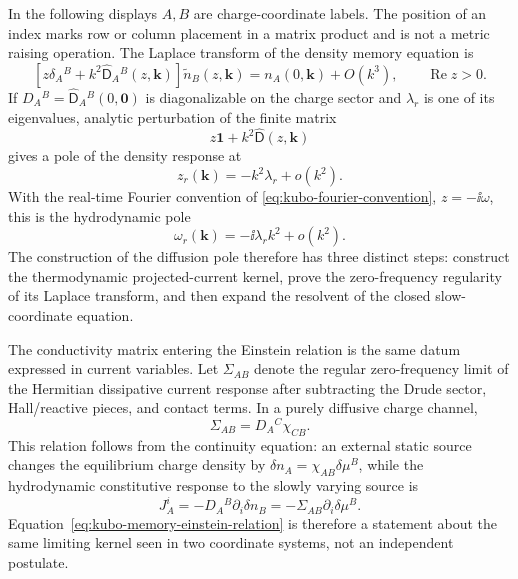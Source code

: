 In the following displays \(A,B\) are charge-coordinate labels.  The position
of an index marks row or column placement in a matrix product and is not a
metric raising operation.  The Laplace transform of the density memory
equation is
\begin{equation}
  \left[
    z\delta_A{}^B
    +
    k^2\widehat{\mathsf D}_{A}{}^{B}(z,\mathbf k)
  \right]
  \widetilde n_B(z,\mathbf k)
  =
  n_A(0,\mathbf k)
  +O(k^3),
  \qquad \operatorname{Re}z>0 .
  \label{eq:kubo-memory-laplace-density-equation}
\end{equation}
If \(D_A{}^B=\widehat{\mathsf D}_{A}{}^{B}(0,\mathbf0)\) is diagonalizable
on the charge sector and \(\lambda_r\) is one of its eigenvalues, analytic
perturbation of the finite matrix
\[
  z\mathbf 1+k^2\widehat{\mathsf D}(z,\mathbf k)
\]
gives a pole of the density response at
\begin{equation}
  z_r(\mathbf k)
  =
  -k^2\lambda_r+o(k^2).
  \label{eq:kubo-memory-diffusive-laplace-pole}
\end{equation}
With the real-time Fourier convention of
\eqref{eq:kubo-fourier-convention}, \(z=-\ii\omega\), this is the
hydrodynamic pole
\begin{equation}
  \omega_r(\mathbf k)
  =
  -\ii\lambda_r k^2+o(k^2).
  \label{eq:kubo-memory-diffusive-frequency-pole}
\end{equation}
The construction of the diffusion pole therefore has three distinct steps:
construct the thermodynamic projected-current kernel, prove the
zero-frequency regularity of its Laplace transform, and then expand the
resolvent of the closed slow-coordinate equation.

The conductivity matrix entering the Einstein relation is the same datum
expressed in current variables.  Let \(\Sigma_{AB}\) denote the regular
zero-frequency limit of the Hermitian dissipative current response after
subtracting the Drude sector, Hall/reactive pieces, and contact terms.  In a
purely diffusive charge channel,
\begin{equation}
  \Sigma_{AB}
  =
  D_A{}^C\chi_{CB}.
  \label{eq:kubo-memory-einstein-relation}
\end{equation}
This relation follows from the continuity equation: an external static
source changes the equilibrium charge density by
\(\delta n_A=\chi_{AB}\delta\mu^B\), while the hydrodynamic constitutive
response to the slowly varying source is
\[
  J_A^i=-D_A{}^B\partial_i\delta n_B
  =-\Sigma_{AB}\partial_i\delta\mu^B .
\]
Equation~\eqref{eq:kubo-memory-einstein-relation} is therefore a statement
about the same limiting kernel seen in two coordinate systems, not an
independent postulate.

